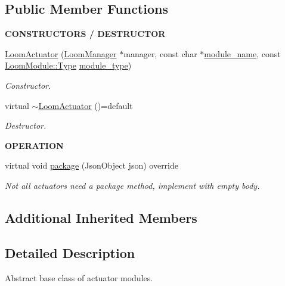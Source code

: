 \subsection*{Public Member Functions}
\begin{Indent}{\bf C\+O\+N\+S\+T\+R\+U\+C\+T\+O\+RS / D\+E\+S\+T\+R\+U\+C\+T\+OR}\par
\begin{DoxyCompactItemize}
\item 
\hyperlink{class_loom_actuator_a3a789588b9092dae071cd236bc72e698}{Loom\+Actuator} (\hyperlink{class_loom_manager}{Loom\+Manager} $\ast$manager, const char $\ast$\hyperlink{class_loom_module_adf6e68ad7e9fa2acfca7a8a280680764}{module\+\_\+name}, const \hyperlink{class_loom_module_aee91d0a75140d51ee428fc2d4417d865}{Loom\+Module\+::\+Type} \hyperlink{class_loom_module_a152d394f37236a2b159dae19da67eeb0}{module\+\_\+type})
\begin{DoxyCompactList}\small\item\em Constructor. \end{DoxyCompactList}\item 
virtual \hyperlink{class_loom_actuator_a397f57e44b59f1705829bd9f44ae6187}{$\sim$\+Loom\+Actuator} ()=default
\begin{DoxyCompactList}\small\item\em Destructor. \end{DoxyCompactList}\end{DoxyCompactItemize}
\end{Indent}
\begin{Indent}{\bf O\+P\+E\+R\+A\+T\+I\+ON}\par
\begin{DoxyCompactItemize}
\item 
virtual void \hyperlink{class_loom_actuator_abf895d8f41379ff53dff666d9d2791a2}{package} (Json\+Object json) override
\begin{DoxyCompactList}\small\item\em Not all actuators need a package method, implement with empty body. \end{DoxyCompactList}\end{DoxyCompactItemize}
\end{Indent}
\subsection*{Additional Inherited Members}


\subsection{Detailed Description}
Abstract base class of actuator modules. 

